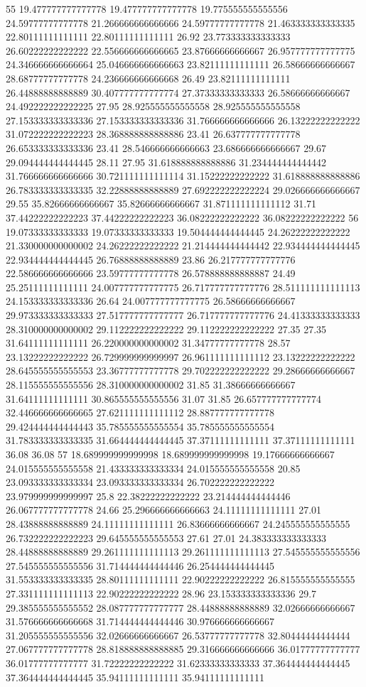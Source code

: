 55 19.477777777777778 19.477777777777778 19.775555555555556 24.59777777777778 21.266666666666666 24.59777777777778 21.463333333333335 22.80111111111111 22.80111111111111 26.92 23.773333333333333 26.60222222222222 22.556666666666665 23.87666666666667 26.957777777777775 24.346666666666664 25.046666666666663 23.82111111111111 26.58666666666667 28.68777777777778 24.236666666666668 26.49 23.82111111111111 26.44888888888889 30.407777777777774 27.37333333333333 26.58666666666667 24.492222222222225 27.95 28.925555555555558 28.925555555555558 27.153333333333336 27.153333333333336 31.766666666666666 26.13222222222222 31.072222222222223 28.368888888888886 23.41 26.637777777777778 26.653333333333336 23.41 28.546666666666663 23.686666666666667 29.67 29.094444444444445 28.11 27.95 31.618888888888886 31.234444444444442 31.766666666666666 30.721111111111114 31.15222222222222 31.618888888888886 26.783333333333335 32.22888888888889 27.692222222222224 29.026666666666667 29.55 35.82666666666667 35.82666666666667 31.871111111111112 31.71 37.44222222222223 37.44222222222223 36.08222222222222 36.08222222222222
56 19.07333333333333 19.07333333333333 19.504444444444445 24.26222222222222 21.330000000000002 24.26222222222222 21.214444444444442 22.934444444444445 22.934444444444445 26.76888888888889 23.86 26.217777777777776 22.586666666666666 23.59777777777778 26.578888888888887 24.49 25.25111111111111 24.007777777777775 26.717777777777776 28.511111111111113 24.153333333333336 26.64 24.007777777777775 26.58666666666667 29.973333333333333 27.517777777777777 26.717777777777776 24.41333333333333 28.310000000000002 29.112222222222222 29.112222222222222 27.35 27.35 31.64111111111111 26.220000000000002 31.34777777777778 28.57 23.13222222222222 26.729999999999997 26.961111111111112 23.13222222222222 28.645555555555553 23.36777777777778 29.702222222222222 29.28666666666667 28.115555555555556 28.310000000000002 31.85 31.38666666666667 31.64111111111111 30.865555555555556 31.07 31.85 26.657777777777774 32.446666666666665 27.621111111111112 28.887777777777778 29.424444444444443 35.785555555555554 35.785555555555554 31.783333333333335 31.664444444444445 37.37111111111111 37.37111111111111 36.08 36.08
57 18.689999999999998 18.689999999999998 19.17666666666667 24.015555555555558 21.433333333333334 24.015555555555558 20.85 23.093333333333334 23.093333333333334 26.702222222222222 23.979999999999997 25.8 22.38222222222222 23.214444444444446 26.067777777777778 24.66 25.296666666666663 24.11111111111111 27.01 28.43888888888889 24.11111111111111 26.83666666666667 24.245555555555555 26.732222222222223 29.645555555555553 27.61 27.01 24.383333333333333 28.44888888888889 29.261111111111113 29.261111111111113 27.545555555555556 27.545555555555556 31.714444444444446 26.254444444444445 31.553333333333335 28.80111111111111 22.90222222222222 26.815555555555555 27.331111111111113 22.90222222222222 28.96 23.153333333333336 29.7 29.385555555555552 28.087777777777777 28.44888888888889 32.02666666666667 31.576666666666668 31.714444444444446 30.976666666666667 31.205555555555556 32.02666666666667 26.53777777777778 32.80444444444444 27.067777777777778 28.818888888888885 29.316666666666666 36.01777777777777 36.01777777777777 31.72222222222222 31.62333333333333 37.364444444444445 37.364444444444445 35.94111111111111 35.94111111111111
